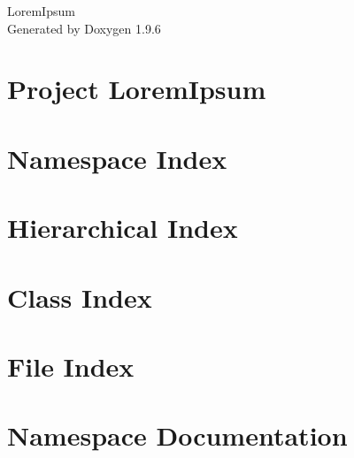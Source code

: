 \documentclass[twoside]{book}
\newcommand{\+}{\discretionary{\mbox{\scriptsize$\hookleftarrow$}}{}{}}
\newcommand{\clearemptydoublepage}{%
    \newpage{\pagestyle{empty}\cleardoublepage}%
  }
\begin{document}
  \raggedbottom
    \hypersetup{pageanchor=false,
                bookmarksnumbered=true,
                pdfencoding=unicode
               }
  \begin{titlepage}
  \vspace*{7cm}
  \begin{center}%
  {\Large Lorem\+Ipsum}\\
  \vspace*{1cm}
  {\large Generated by Doxygen 1.9.6}\\
  \end{center}
  \end{titlepage}
  \clearemptydoublepage
  \tableofcontents
  \clearemptydoublepage
  \hypersetup{pageanchor=true}
\chapter{Project Lorem\+Ipsum}
\label{md__c___users_loren__downloads_loremipsum_main_loremipsum_main__r_e_a_d_m_e}

\chapter{Namespace Index}

\chapter{Hierarchical Index}

\chapter{Class Index}

\chapter{File Index}

\chapter{Namespace Documentation}















\end{document}
